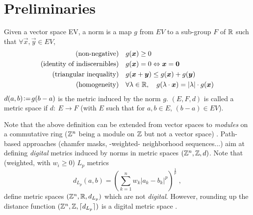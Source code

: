 \documentclass{llncs}
\begin{document}
\section{Preliminaries}
\label{sec:preliminaries}
\begin{definition}
  \label{def:norm}
  Given a vector space EV, a norm is a map $g$ from  $EV$ to a sub-group
  $F$ of ${\mathbb{R}}$ such that $\forall \vec{x},\vec{y}\in EV$,
  \begin{align}
    (\text{non-negative})\quad & g(\vec{x})\geq 0\\
    (\text{identity of indiscernibles}) \quad&  g(\vec{x})= 0
    \Leftrightarrow \vec{x}=\vec{0}\\
    (\text{triangular inequality})\quad &   g(\vec{x}+\vec{y}) \leq
    g(\vec{x}) + g(\vec{y})\\
    (\text{homogeneity})\quad &  \forall \lambda\in\R, \quad
    g(\lambda\cdot\vec{x}) = |\lambda|\cdot g(\vec{x})
  \end{align}
$d(a,b) \!\mathrel{\mathop:}=\! g(b-a)$ is the metric induced by the
  norm $g$.  $(E, F, d)$ is called a  metric space if $d:~E\rightarrow
  F$ (with $E$ such that for $a,b\in E$, $(b-a)\in EV$).
\end{definition}
Note that the above definition can be extended from vector spaces to
\emph{modules} on a commutative ring (${\mathbb{Z}}^n$ being a module on ${\mathbb{Z}}$
but not a vector space) \cite{Thiel_hdr}. Path-based approaches
(chamfer masks, -weighted- neighborhood sequences...)  aim at defining
\emph{digital}
metrics induced by norms in metric spaces $({\mathbb{Z}}^n, {\mathbb{Z}} , d)$.  Note that
(weighted, with $w_i\geq 0$) $L_p$ metrics
\begin{equation}
    d_{L_p} (a,b) = \left ( \sum_{k=1}^n w_k|a_k-b_k |^p \right )^{\frac{1}{p}}\;,
  \end{equation}
define metric spaces $({\mathbb{Z}}^n, {\mathbb{R}} , d_{L_p})$ which are not
\emph{digital}. However, rounding up the \sloppy distance function
$({\mathbb{Z}}^n,{\mathbb{Z}}, \lceil d_{L_p}\rceil)$ is a digital metric space
\cite{klette_book}.
\end{document}
